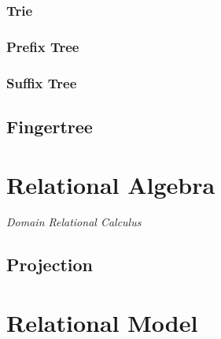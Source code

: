 \subsubsection{Trie}\label{sec:trie}

\subsubsection{Prefix Tree}\label{sec:prefix_tree}

\subsubsection{Suffix Tree}\label{sec:suffix_tree}



\subsection{Fingertree}\label{sec:fingertree}



\section{Relational Algebra}\label{sec:relational_algebra}

\emph{Domain Relational Calculus}



\subsection{Projection}\label{sec:relational_projection}



\section{Relational Model}\label{sec:relational_model}

